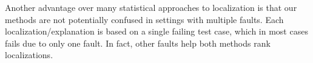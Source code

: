 Another advantage over many statistical approaches to
localization is that our methods are not potentially confused in
settings with multiple faults.  Each localization/explanation is based
on a single failing test case, which in most cases fails due to only one
fault.  In fact, other faults help both methods rank localizations.